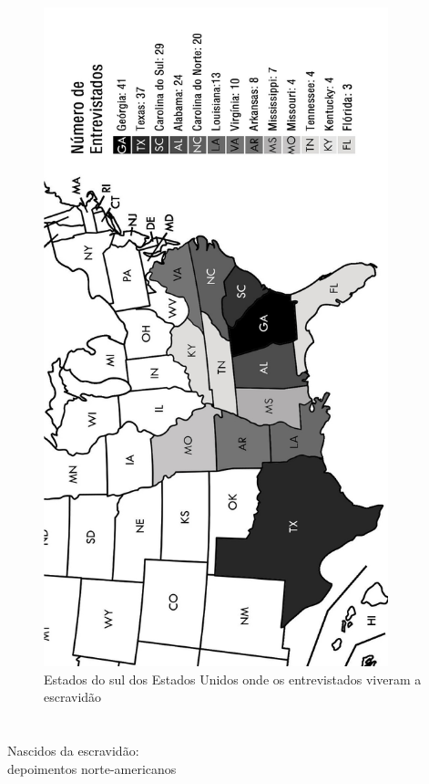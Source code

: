 \movetoevenpage
\thispagestyle{empty}
\begin{absolutelynopagebreak}
\begin{vplace}
\begin{figure}[H]
\begin{adjustwidth}{-1.7cm}{}
  \vspace*{-2cm}
  \includegraphics[width=100mm]{./imgs/mapa.jpg}  
\end{adjustwidth}
  \caption{Estados do sul dos Estados Unidos onde os entrevistados viveram a escravidão}
\end{figure}
\end{vplace}

\end{absolutelynopagebreak}

\chapter*{}
\begin{center}
\begin{vplace}[0.3]
\Large
Nascidos da escravidão:\\
depoimentos norte-americanos
\end{vplace}
\end{center}
\thispagestyle{empty}

